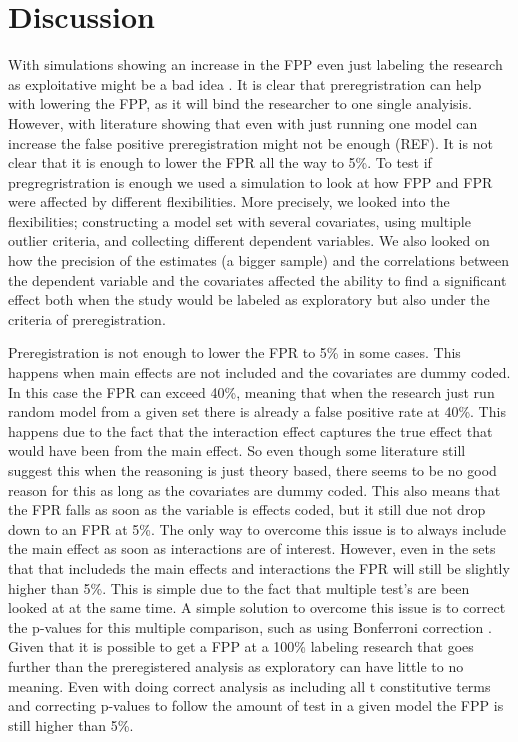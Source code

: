 \section{Discussion}
With simulations showing an increase in the FPP even just labeling the research as exploitative might be a bad idea \citep{Simmons2011}. It is clear that preregristration can help with lowering the FPP, as it will bind the researcher to one single analyisis. However, with literature showing that even with just running one model can increase the false positive preregistration might not be enough (REF). It is not clear that it is enough to lower the FPR all the way to 5\%. To test if pregregristration is enough we used a simulation to look at how FPP and FPR were affected by different flexibilities. More precisely, we looked into the flexibilities; constructing a model set with several covariates, using multiple outlier criteria, and collecting different dependent variables. We also looked on how the precision of the estimates (a bigger sample) and the correlations between the dependent variable and the covariates affected the ability to find a significant effect both when the study would be labeled as exploratory but also under the criteria of preregistration. 

Preregistration is not enough to lower the FPR to 5\%  in some cases. This happens when main effects are not included and the covariates are dummy coded. In this case the FPR can exceed 40\%, meaning that when the research just run random model from a given set there is already a false positive rate at 40\%. This happens due to the fact that the interaction effect captures the true effect that would have been from the main effect. So even though some literature still suggest this when the reasoning is just theory based, there seems to be no good reason for this as long as the covariates are dummy coded. This also means that the FPR falls as soon as the variable is effects coded, but it still due not drop down to an FPR at 5\%. The only way to overcome this issue is to always include the main effect as soon as interactions are of interest. However, even in the sets that that includeds the main effects and interactions the FPR will still be slightly higher than 5\%. This is simple due to the fact that multiple test's are been looked at at the same time. A simple solution to overcome this issue is to correct the p-values for this multiple comparison, such as using Bonferroni correction \citep{dunn1961multiple}.
Given that it is possible to get a FPP at a 100\% labeling research that goes further than the preregistered analysis as exploratory can have little to no meaning. Even with doing correct analysis as including all t constitutive terms and correcting p-values to follow the amount of test in a given model the FPP is still higher than 5\%. 
    
